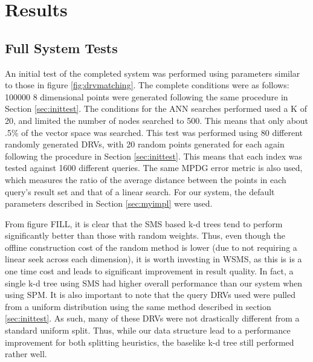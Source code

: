 \chapter{Results} %

\label{results} %


\section{Full System Tests}
\label{sec:fullsystest}

An initial test of the completed system was performed using parameters similar to those in figure \ref{fig:drvmatching}.  The complete conditions were as follows: 100000 8 dimensional points were generated following the same procedure in Section \ref{sec:inittest}.  The conditions for the ANN searches performed used a K of 20, and limited the number of nodes searched to 500.  This means that only about .5\% of the vector space was searched.  This test was performed using 80 different randomly generated DRVs, with 20 random points generated for each again following the procedure in Section \ref{sec:inittest}.  This means that each index was tested against 1600 different queries.  The same MPDG error metric is also used, which measures the ratio of the average distance between the points in each query's result set and that of a linear search.  For our system, the default parameters described in Section \ref{sec:myimpl} were used.

From figure FILL, it is clear that the SMS based k-d trees tend to perform significantly better than those with random weights.  Thus, even though the offline construction cost of the random method is lower (due to not requiring a linear seek across each dimension), it is worth investing in WSMS, as this is is a one time cost and leads to significant improvement in result quality.  In fact, a single k-d tree using SMS had higher overall performance than our system when using SPM.  It is also important to note that the query DRVs used were pulled from a uniform distribution using the same method described in section \ref{sec:inittest}.  As such, many of these DRVs were not drastically different from a standard uniform split.  Thus, while our data structure lead to a performance improvement for both splitting heuristics, the baselike k-d tree still performed rather well.

